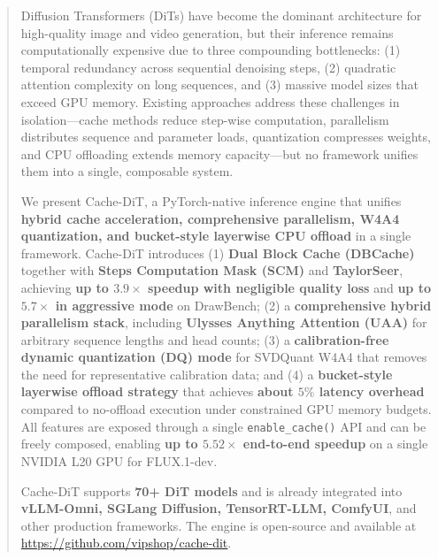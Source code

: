 \documentclass[10pt]{article}
\begin{document}
\begin{abstract}
Diffusion Transformers (DiTs) have become the dominant architecture for high-quality image and video generation, but their inference remains computationally expensive due to three compounding bottlenecks: (1) temporal redundancy across sequential denoising steps, (2) quadratic attention complexity on long sequences, and (3) massive model sizes that exceed GPU memory. Existing approaches address these challenges in isolation---cache methods reduce step-wise computation, parallelism distributes sequence and parameter loads, quantization compresses weights, and CPU offloading extends memory capacity---but no framework unifies them into a single, composable system.

We present Cache-DiT, a PyTorch-native inference engine that unifies \textbf{hybrid cache acceleration, comprehensive parallelism, W4A4 quantization, and bucket-style layerwise CPU offload} in a single framework. Cache-DiT introduces (1) \textbf{Dual Block Cache (DBCache)} together with \textbf{Steps Computation Mask (SCM)} and \textbf{TaylorSeer}, achieving \textbf{up to $3.9\times$ speedup with negligible quality loss} and \textbf{up to $5.7\times$ in aggressive mode} on DrawBench; (2) a \textbf{comprehensive hybrid parallelism stack}, including \textbf{Ulysses Anything Attention (UAA)} for arbitrary sequence lengths and head counts; (3) a \textbf{calibration-free dynamic quantization (DQ) mode} for SVDQuant W4A4 that removes the need for representative calibration data; and (4) a \textbf{bucket-style layerwise offload strategy} that achieves \textbf{about $5\%$ latency overhead} compared to no-offload execution under constrained GPU memory budgets. All features are exposed through a single \texttt{enable\_cache()} API and can be freely composed, enabling \textbf{up to $5.52\times$ end-to-end speedup} on a single NVIDIA L20 GPU for FLUX.1-dev.

Cache-DiT supports \textbf{70+ DiT models} and is already integrated into \textbf{vLLM-Omni, SGLang Diffusion, TensorRT-LLM, ComfyUI}, and other production frameworks. The engine is open-source and available at \url{https://github.com/vipshop/cache-dit}.
\end{abstract}

\end{document}
